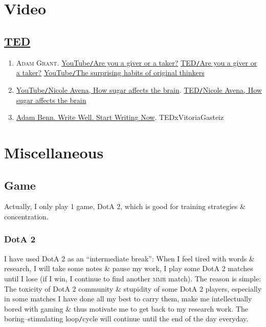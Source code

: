\documentclass{article}
\numberwithin{equation}{section}
\begin{document}

\section{Video}

\subsection{\href{https://www.ted.com/}{TED}}

\begin{enumerate}
	\item \textsc{Adam Grant.} \href{https://www.youtube.com/watch?v=YyXRYgjQXX0}{YouTube\texttt{/}Are you a giver or a taker?} \href{https://www.ted.com/talks/adam_grant_are_you_a_giver_or_a_taker}{TED\texttt{/}Are you a giver or a taker?} \href{https://www.youtube.com/watch?v=fxbCHn6gE3U}{YouTube\texttt{/}The surprising habits of original thinkers}
	\item \href{https://www.youtube.com/watch?v=lEXBxijQREo}{YouTube\texttt{/}Nicole Avena, How sugar affects the brain}. \href{https://ed.ted.com/lessons/how-sugar-affects-the-brain-nicole-avena}{TED\texttt{/}Nicole Avena, How sugar affects the brain}
	\item \href{https://www.youtube.com/watch?v=KUKgJsvoDUk}{Adam Benn. Write Well. Start Writing Now}. TEDxVitoriaGasteiz
\end{enumerate}


\section{Miscellaneous}

\subsection{Game}
Actually, I only play 1 game, DotA 2, which is good for training strategies \& concentration.

\subsubsection{DotA 2}
I have used DotA 2 as an ``intermediate break'': When I feel tired with words \& research, I will take some notes \& pause my work, I play some DotA 2 matches until I lose (if I win, I continue to find another \textsc{mmr} match). The reason is simple: The toxicity of DotA 2 community \& stupidity of some DotA 2 players, especially in some matches I have done all my best to carry them, make me intellectually bored with gaming \& thus motivate me to get back to my research work. The boring--stimulating loop\texttt{/}cycle will continue until the end of the day everyday.
\end{document}
